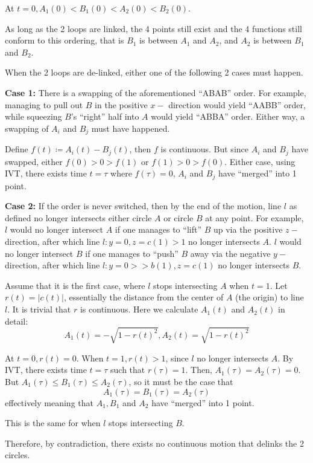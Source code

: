 \documentclass[a4paper, 11pt]{article}
\begin{document}
\begin{solution}
    At $t = 0, A_1(0) < B_1(0) < A_2(0) < B_2(0)$.

    As long as the 2 loops are linked, the 4 points still exist and the 4 functions still conform to this ordering, that is $B_1$ is between $A_1$ and $A_2$, and $A_2$ is between $B_1$ and $B_2$.

    When the 2 loops are de-linked, either one of the following 2 cases must happen.

    \textbf{Case 1:} There is a swapping of the aforementioned ``ABAB'' order. For example, managing to pull out $B$ in the positive $x-$ direction would yield ``AABB'' order, while squeezing $B$'s ``right'' half into $A$ would yield ``ABBA'' order. Either way, a swapping of $A_i$ and $B_j$ must have happened.

    Define $f(t) \coloneqq A_i(t) - B_j(t)$, then $f$ is continuous. But since $A_i$ and $B_j$ have swapped, either $f(0) > 0 > f(1)$ or $f(1) > 0 > f(0)$. Either case, using IVT, there exists time $t = \tau$ where $f(\tau) = 0$, $A_i$ and $B_j$ have ``merged'' into 1 point. \contra

    \textbf{Case 2:} If the order is never switched, then by the end of the motion, line $l$ as defined no longer intersects either circle $A$ or circle $B$ at any point. For example, $l$ would no longer intersect $A$ if one manages to ``lift'' $B$ up via the positive $z-$direction, after which line $l: y = 0, z = c(1) > 1$ no longer intersects $A$. $l$ would no longer intersect $B$ if one manages to ``push'' $B$ away via the negative $y-$direction, after which line $l: y = 0 >> b(1), z = c(1)$ no longer intersects $B$.

    Assume that it is the first case, where $l$ stops intersecting $A$ when $t = 1$. Let $r(t) = |c(t)|$, essentially the distance from the center of $A$ (the origin) to line $l$. It is trivial that $r$ is continuous. Here we calculate $A_1(t)$ and $A_2(t)$ in detail:
    \[
    A_1(t) = - \sqrt{1 - r(t)^2}, A_2(t) = \sqrt{1 - r(t)^2}
    \]

    At $t = 0, r(t) = 0$. When $t = 1, r(t) > 1$, since $l$ no longer intersects $A$. By IVT, there exists time $t = \tau$ such that $r(\tau) = 1$. Then, $A_1(\tau) = A_2(\tau) = 0$. But $A_1(\tau) \leq B_1(\tau) \leq A_2(\tau)$, so it must be the case that \[
        A_1(\tau) = B_1(\tau) = A_2(\tau)
    \]
    effectively meaning that $A_1, B_1$ and $A_2$ have ``merged'' into 1 point. 
    
    This is the same for when $l$ stops intersecting $B$. \contra

    Therefore, by contradiction, there exists no continuous motion that delinks the 2 circles.
\end{solution}
\end{document}
